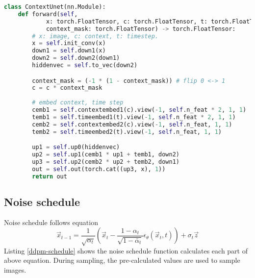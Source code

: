 \begin{lstlisting}[language=Python, caption={Python code of \textcolor{blue}{\textbf{ContextUnet}} of DDPM (some code is omitted).}, label={ddpm-unet-part}]
class ContextUnet(nn.Module):
    def forward(self, 
            x: torch.FloatTensor, c: torch.FloatTensor, t: torch.FloatTensor, 
            context_mask: torch.FloatTensor) -> torch.FloatTensor:
        # x: image, c: context, t: timestep.
        x = self.init_conv(x)
        down1 = self.down1(x)
        down2 = self.down2(down1)
        hiddenvec = self.to_vec(down2)

        context_mask = (-1 * (1 - context_mask)) # flip 0 <-> 1
        c = c * context_mask
        
        # embed context, time step
        cemb1 = self.contextembed1(c).view(-1, self.n_feat * 2, 1, 1)
        temb1 = self.timeembed1(t).view(-1, self.n_feat * 2, 1, 1)
        cemb2 = self.contextembed2(c).view(-1, self.n_feat, 1, 1)
        temb2 = self.timeembed2(t).view(-1, self.n_feat, 1, 1)

        up1 = self.up0(hiddenvec)
        up2 = self.up1(cemb1 * up1 + temb1, down2)
        up3 = self.up2(cemb2 * up2 + temb2, down1)
        out = self.out(torch.cat((up3, x), 1))
        return out\end{lstlisting}

\subsection{Noise schedule}
\indent
    Noise schedule follows equation
    $$
    \vec{x}_{t - 1} = \frac{1}{\sqrt{\alpha_t}}\left(\vec{x}_t - \frac{1 - \alpha_t}{\sqrt{1 - \bar{\alpha}_t}}\epsilon_\theta(\vec{x}_t, t)\right) + \sigma_t\vec{z}
    $$
    Listing \ref{ddpm-schedule} shows the noise schedule function calculates each part of above equation. 
    During sampling, the pre-calculated values are used to sample images.\pagebreak


